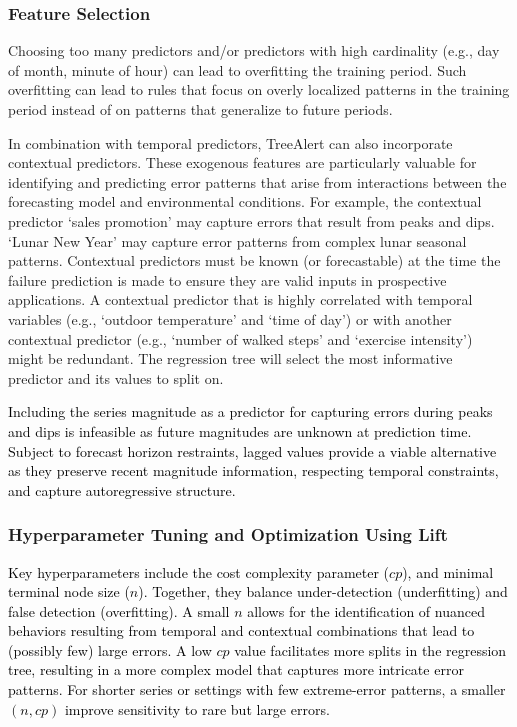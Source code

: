 \documentclass[]{interact}
\newcommand{\matt}[1]{\textcolor{black}{#1}}
\theoremstyle{plain}
\theoremstyle{definition}
\theoremstyle{remark}
\begin{document}
\subsubsection{Feature Selection}
Choosing too many predictors and/or predictors with high cardinality (e.g., day of month, minute of hour) can lead to overfitting the training period. Such overfitting can lead to rules that focus on overly localized patterns in the training period instead of on patterns that generalize to future periods.

In combination with temporal predictors, TreeAlert can also incorporate contextual predictors. These exogenous features are particularly valuable for identifying and predicting error patterns that arise from interactions between the forecasting model and environmental conditions. For example, the contextual predictor `sales promotion' may capture errors that result from peaks and dips. `Lunar New Year' may capture error patterns from complex lunar seasonal patterns. Contextual predictors must be known (or forecastable) at the time the failure prediction is made to ensure they are valid inputs in prospective applications. A contextual predictor that is highly correlated with temporal variables (e.g., `outdoor temperature' and `time of day') or with another contextual predictor (e.g., `number of walked steps' and `exercise intensity') might be redundant. The regression tree will select the most informative predictor and its values to split on.

\matt{Including the series magnitude as a predictor for capturing errors during peaks and dips is infeasible as future magnitudes are unknown at prediction time. Subject to forecast horizon restraints, lagged values provide a viable alternative as they preserve recent magnitude information, respecting temporal constraints, and capture autoregressive structure.}

\subsubsection{Hyperparameter Tuning and Optimization Using Lift}
\label{sec:tuning_optimization}

\matt{Key hyperparameters include the cost complexity parameter ($cp$), and minimal terminal node size ($n$). Together, they balance under-detection (underfitting) and false detection (overfitting). A small $n$ allows for the identification of nuanced behaviors resulting from temporal and contextual combinations that lead to (possibly few) large errors. A low $cp$ value facilitates more splits in the regression tree, resulting in a more complex model that captures more intricate error patterns. For shorter series or settings with few extreme-error patterns, a smaller $(n, cp)$ improve sensitivity to rare but large errors.}
\end{document}
